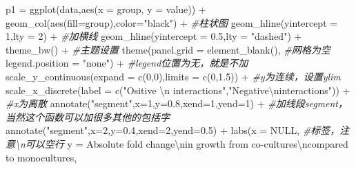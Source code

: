 \documentclass[
]{book}
\newenvironment{Shaded}{\begin{snugshade}}{\end{snugshade}}
\newcommand{\AttributeTok}[1]{\textcolor[rgb]{0.77,0.63,0.00}{#1}}
\newcommand{\CommentTok}[1]{\textcolor[rgb]{0.56,0.35,0.01}{\textit{#1}}}
\newcommand{\ConstantTok}[1]{\textcolor[rgb]{0.00,0.00,0.00}{#1}}
\newcommand{\DecValTok}[1]{\textcolor[rgb]{0.00,0.00,0.81}{#1}}
\newcommand{\FloatTok}[1]{\textcolor[rgb]{0.00,0.00,0.81}{#1}}
\newcommand{\FunctionTok}[1]{\textcolor[rgb]{0.00,0.00,0.00}{#1}}
\newcommand{\NormalTok}[1]{#1}
\newcommand{\OtherTok}[1]{\textcolor[rgb]{0.56,0.35,0.01}{#1}}
\newcommand{\SpecialCharTok}[1]{\textcolor[rgb]{0.00,0.00,0.00}{#1}}
\newcommand{\StringTok}[1]{\textcolor[rgb]{0.31,0.60,0.02}{#1}}
\begin{document}
\begin{Shaded}
\begin{Highlighting}[]
\NormalTok{p1 }\OtherTok{=} \FunctionTok{ggplot}\NormalTok{(data,}\FunctionTok{aes}\NormalTok{(}\AttributeTok{x =}\NormalTok{ group, }\AttributeTok{y =}\NormalTok{ value)) }\SpecialCharTok{+}
  \FunctionTok{geom\_col}\NormalTok{(}\FunctionTok{aes}\NormalTok{(}\AttributeTok{fill=}\NormalTok{group),}\AttributeTok{color=}\StringTok{"black"}\NormalTok{) }\SpecialCharTok{+}  \CommentTok{\#柱状图}
  \FunctionTok{geom\_hline}\NormalTok{(}\AttributeTok{yintercept =} \DecValTok{1}\NormalTok{,}\AttributeTok{lty =} \DecValTok{2}\NormalTok{) }\SpecialCharTok{+} \CommentTok{\#加横线}
  \FunctionTok{geom\_hline}\NormalTok{(}\AttributeTok{yintercept =} \FloatTok{0.5}\NormalTok{,}\AttributeTok{lty =} \StringTok{"dashed"}\NormalTok{) }\SpecialCharTok{+}
  \FunctionTok{theme\_bw}\NormalTok{() }\SpecialCharTok{+} \CommentTok{\#主题设置}
  \FunctionTok{theme}\NormalTok{(}\AttributeTok{panel.grid =} \FunctionTok{element\_blank}\NormalTok{(), }\CommentTok{\#网格为空}
        \AttributeTok{legend.position =} \StringTok{"none"}\NormalTok{) }\SpecialCharTok{+} \CommentTok{\#legend位置为无，就是不加}
  \FunctionTok{scale\_y\_continuous}\NormalTok{(}\AttributeTok{expand =} \FunctionTok{c}\NormalTok{(}\DecValTok{0}\NormalTok{,}\DecValTok{0}\NormalTok{),}\AttributeTok{limits =} \FunctionTok{c}\NormalTok{(}\DecValTok{0}\NormalTok{,}\FloatTok{1.5}\NormalTok{)) }\SpecialCharTok{+}  \CommentTok{\#y为连续，设置ylim}
  \FunctionTok{scale\_x\_discrete}\NormalTok{(}\AttributeTok{label =} \FunctionTok{c}\NormalTok{(}\StringTok{"Ositive }\SpecialCharTok{\textbackslash{}n}\StringTok{ interactions"}\NormalTok{,}\StringTok{"Negative}\SpecialCharTok{\textbackslash{}n}\StringTok{interactions"}\NormalTok{)) }\SpecialCharTok{+} \CommentTok{\#x为离散}
  \FunctionTok{annotate}\NormalTok{(}\StringTok{"segment"}\NormalTok{,}\AttributeTok{x=}\DecValTok{1}\NormalTok{,}\AttributeTok{y=}\FloatTok{0.8}\NormalTok{,}\AttributeTok{xend=}\DecValTok{1}\NormalTok{,}\AttributeTok{yend=}\DecValTok{1}\NormalTok{) }\SpecialCharTok{+} \CommentTok{\#加线段segment，当然这个函数可以加很多其他的包括字}
  \FunctionTok{annotate}\NormalTok{(}\StringTok{"segment"}\NormalTok{,}\AttributeTok{x=}\DecValTok{2}\NormalTok{,}\AttributeTok{y=}\FloatTok{0.4}\NormalTok{,}\AttributeTok{xend=}\DecValTok{2}\NormalTok{,}\AttributeTok{yend=}\FloatTok{0.5}\NormalTok{) }\SpecialCharTok{+}
  \FunctionTok{labs}\NormalTok{(}\AttributeTok{x =} \ConstantTok{NULL}\NormalTok{,  }\CommentTok{\#标签，注意\textbackslash{}n可以空行}
       \AttributeTok{y =} \StringTok{\textquotesingle{}Absolute fold change}\SpecialCharTok{\textbackslash{}n}\StringTok{in growth from co{-}cultures}\SpecialCharTok{\textbackslash{}n}\StringTok{compared to monocultures\textquotesingle{}}\NormalTok{,}

\end{Highlighting}
\end{Shaded}
\end{document}
